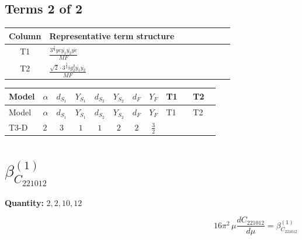 \documentclass[8pt]{article}
\begin{document}
\begin{landscape}
\subsection*{Terms 2 of 2}
\begin{center}
\begin{tabular}{@{}c >{\raggedright\arraybackslash}p{0.82\linewidth}@{}}
\toprule
Column & Representative term structure \\
\midrule
T1 & \(\displaystyle \frac{3^{\frac{3}{4}} ye \overline{y_{1}} \overline{y_{2}} \overline{ye}}{MF}\) \\
\midrule
T2 & \(\displaystyle \frac{\sqrt{2} \cdot 3^{\frac{3}{4}} i g_{2}^{2} \overline{y_{1}} \overline{y_{2}}}{MF}\) \\
\midrule
\bottomrule
\end{tabular}
\end{center}
\smallskip
\tiny
\begin{longtable}{@{}llcccccc >{\raggedright\arraybackslash}p{0.21\linewidth} >{\raggedright\arraybackslash}p{0.21\linewidth}@{}}
\toprule
Model & $\alpha$ & $d_{S_1}$ & $Y_{S_1}$ & $d_{S_2}$ & $Y_{S_2}$ & $d_F$ & $Y_F$ & T1 & T2 \\
\midrule
\endfirsthead
\toprule
Model & $\alpha$ & $d_{S_1}$ & $Y_{S_1}$ & $d_{S_2}$ & $Y_{S_2}$ & $d_F$ & $Y_F$ & T1 & T2 \\
\midrule
\endhead
T3-D & $2$ & $3$ & $1$ & $1$ & $2$ & $2$ & $\frac{3}{2}$ & \scriptsize\adjustbox{max width=\linewidth}{$\begin{gathered} \frac{3^{\frac{3}{4}} ye \overline{y_{1}} \overline{y_{2}} \overline{ye}}{12 MF}\end{gathered}$} & \scriptsize\adjustbox{max width=\linewidth}{$\begin{gathered} \frac{\sqrt{2} \cdot 3^{\frac{3}{4}} i g_{2}^{2} \overline{y_{1}} \overline{y_{2}}}{3 MF}\end{gathered}$} \\
\midrule
\bottomrule
\end{longtable}
\clearpage
\section*{$\beta_{C_{221012}}^{(1)}$}
\noindent\textbf{Quantity: }$\mathrm{2,2,10,12}$\par\smallskip
\[16\pi^2\,\mu\frac{d C_{221012}}{d\mu}=\beta_{C_{221012}}^{(1)}\]

\end{landscape}
\end{document}
